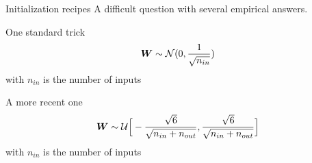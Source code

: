 \begin{frame}{Initialization recipes}
  A difficult question with several empirical answers. 
  \begin{block}{One standard trick}
    $$\boldsymbol{W} \sim \mathcal{N}(0,\frac{1}{\sqrt{n_{in}}})  $$
    with $n_{in}$ is the number of inputs
  \end{block}
  \begin{block}{A more recent one}
    $$\boldsymbol{W} \sim \mathcal{U}
    \Big[-\frac{\sqrt{6}}{\sqrt{n_{in}+n_{out}}},
    \frac{\sqrt{6}}{\sqrt{n_{in}+n_{out}}} \Big]  $$
    with $n_{in}$ is the number of inputs
  \end{block}
\end{frame}
